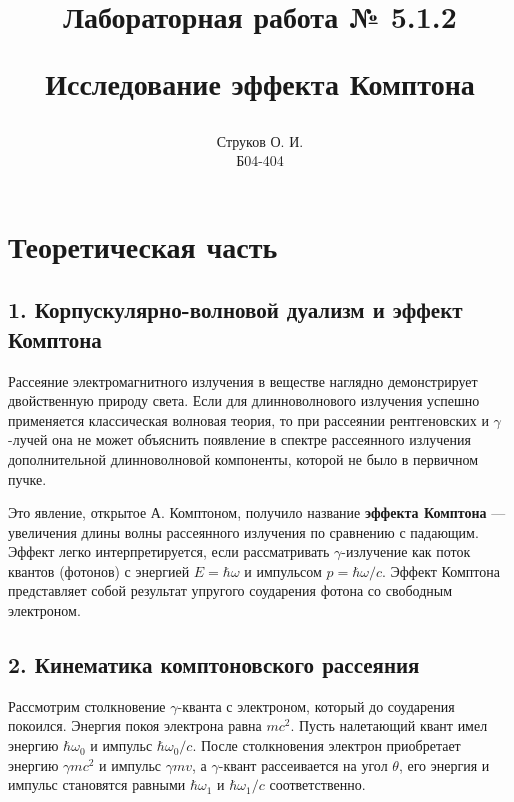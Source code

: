 \documentclass[12pt, a4paper]{article}
\begin{document}
\title{\begin{center}Лабораторная работа № 5.1.2\end{center}
Исследование эффекта Комптона}
\author{Струков О. И. \\ Б04-404}
\date{}

\thispagestyle{empty}
\maketitle
\newpage
{}




\section*{Теоретическая часть}

\subsection*{1. Корпускулярно-волновой дуализм и эффект Комптона}
Рассеяние электромагнитного излучения в веществе наглядно демонстрирует двойственную природу света. Если для длинноволнового излучения успешно применяется классическая волновая теория, то при рассеянии рентгеновских и $\gamma$-лучей она не может объяснить появление в спектре рассеянного излучения дополнительной длинноволновой компоненты, которой не было в первичном пучке. 

Это явление, открытое А. Комптоном, получило название \textbf{эффекта Комптона} --- увеличения длины волны рассеянного излучения по сравнению с падающим. Эффект легко интерпретируется, если рассматривать $\gamma$-излучение как поток квантов (фотонов) с энергией $E = \hbar\omega$ и импульсом $p = \hbar\omega/c$. Эффект Комптона представляет собой результат упругого соударения фотона со свободным электроном.

\subsection*{2. Кинематика комптоновского рассеяния}
Рассмотрим столкновение $\gamma$-кванта с электроном, который до соударения покоился. Энергия покоя электрона равна $mc^2$. Пусть налетающий квант имел энергию $\hbar\omega_0$ и импульс $\hbar\omega_0/c$. После столкновения электрон приобретает энергию $\gamma mc^2$ и импульс $\gamma mv$, а $\gamma$-квант рассеивается на угол $\theta$, его энергия и импульс становятся равными $\hbar\omega_1$ и $\hbar\omega_1/c$ соответственно.
\end{document}

